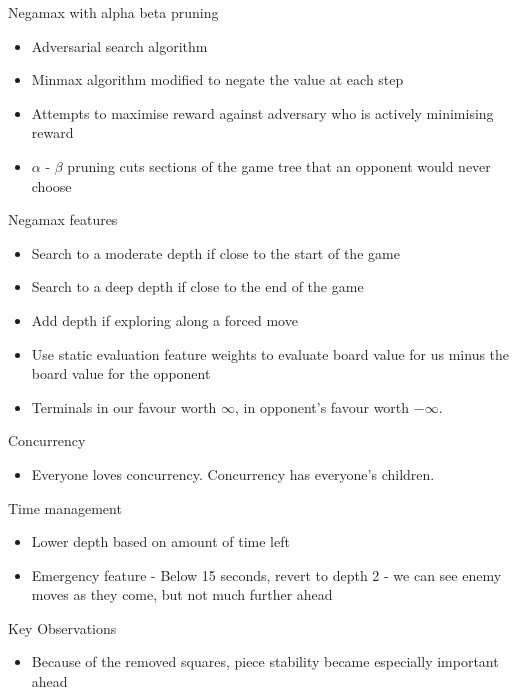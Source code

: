\documentclass{beamer}
\begin{document}
\begin{frame}{Negamax with alpha beta pruning}
    \begin{itemize}
  \item
    Adversarial search algorithm
  \item
    Minmax algorithm modified to negate the value at each step
  \item
    Attempts to maximise reward against adversary who is actively minimising reward
  \item
   $\alpha$ - $\beta$ pruning cuts sections of the game tree that an opponent would never choose
  \end{itemize}
\end{frame}

\begin{frame}{Negamax features}
    \begin{itemize}
  \item
    Search to a moderate depth if close to the start of the game
  \item
    Search to a deep depth if close to the end of the game
  \item
    Add depth if exploring along a forced move
  \item
    Use static evaluation feature weights to evaluate board value for us minus the board value for the opponent
  \item
    Terminals in our favour worth $\infty$, in opponent's favour worth $-\infty$.
  \end{itemize}
\end{frame}

\begin{frame}{Concurrency}
    \begin{itemize}
  \item
    Everyone loves concurrency. Concurrency has everyone's children.
  \end{itemize}
\end{frame}

\begin{frame}{Time management}
    \begin{itemize}
  \item
    Lower depth based on amount of time left
  \item
    Emergency feature - Below 15 seconds, revert to depth 2 - we can see enemy moves as they come, but not much further ahead
  \end{itemize}
\end{frame}

\begin{frame}{Key Observations}
    \begin{itemize}
  \item
    Because of the removed squares, piece stability became especially important ahead
  \end{itemize}
\end{frame}
\end{document}
